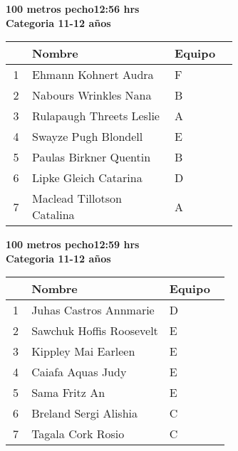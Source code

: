 \begin{minipage}{0.95\linewidth}\vspace{0.5cm} 
\begin{flushleft}
\textbf{
\hspace{-0.15cm}100 metros pecho\hspace{1.5cm}12:56 hrs \\Categoria 11-12 años}\vspace{-0.2cm} 
\end{flushleft}
\begin{tabular}{cp{0.63\linewidth}l}
\hline
& \textbf{Nombre} & \textbf{Equipo} \\ \hline
1 & Ehmann Kohnert Audra & F \\ 
2 & Nabours Wrinkles Nana & B \\ 
3 & Rulapaugh Threets Leslie & A \\ 
4 & Swayze Pugh Blondell & E \\ 
5 & Paulas Birkner Quentin & B \\ 
6 & Lipke Gleich Catarina & D \\ 
7 & Maclead Tillotson Catalina & A \\ 
\end{tabular}
\end{minipage}
\begin{minipage}{0.95\linewidth}\vspace{0.5cm} 
\begin{flushleft}
\textbf{
\hspace{-0.15cm}100 metros pecho\hspace{1.5cm}12:59 hrs \\Categoria 11-12 años}\vspace{-0.2cm} 
\end{flushleft}
\begin{tabular}{cp{0.63\linewidth}l}
\hline
& \textbf{Nombre} & \textbf{Equipo} \\ \hline
1 & Juhas Castros Annmarie & D \\ 
2 & Sawchuk Hoffis Roosevelt & E \\ 
3 & Kippley Mai Earleen & E \\ 
4 & Caiafa Aquas Judy & E \\ 
5 & Sama Fritz An & E \\ 
6 & Breland Sergi Alishia & C \\ 
7 & Tagala Cork Rosio & C \\ 
\end{tabular}
\end{minipage}
